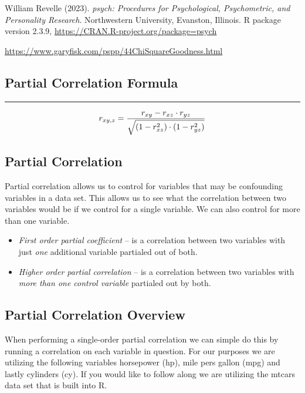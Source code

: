 \documentclass[
]{book}
\providecommand{\tightlist}{%
  \setlength{\itemsep}{0pt}\setlength{\parskip}{0pt}}
\theoremstyle{definition}
\theoremstyle{definition}
\theoremstyle{definition}
\theoremstyle{definition}
\theoremstyle{remark}
\begin{document}
William Revelle (2023). \emph{psych: Procedures for Psychological,
Psychometric, and Personality Research}. Northwestern University,
Evanston, Illinois. R package version 2.3.9,
\url{https://CRAN.R-project.org/package=psych}

\url{https://www.garyfisk.com/pspp/44ChiSquareGoodness.html}

\hypertarget{partial-correlation-formula}{%
\subsection{Partial Correlation Formula}\label{partial-correlation-formula}}

\begin{center}\rule{0.5\linewidth}{0.5pt}\end{center}

\[\Huge
r_{xy,z} = \frac{r_{xy} - r_{xz}  \cdot r_{yz}}{\sqrt{(1-r_{xz}^2) \cdot (1 - r_{yz}^2)}}\]

\hypertarget{partial-correlation}{%
\subsection{Partial Correlation}\label{partial-correlation}}

Partial correlation allows us to control for variables that may be confounding variables in a data set. This allows us to see what the correlation between two variables would be if we control for a single variable. We can also control for more than one variable.

\begin{itemize}
\tightlist
\item
  \emph{First order partial coefficient} -- is a correlation between two variables with just \emph{one} additional variable partialed out of both.
\item
  \emph{Higher order partial correlation} -- is a correlation between two variables with \emph{more than one control variable} partialed out by both.
\end{itemize}

\hypertarget{partial-correlation-overview}{%
\subsection{Partial Correlation Overview}\label{partial-correlation-overview}}

When performing a single-order partial correlation we can simple do this by running a correlation on each variable in question. For our purposes we are utilizing the following variables horsepower (hp), mile pers gallon (mpg) and lastly cylinders (cy). If you would like to follow along we are utilizing the mtcars data set that is built into R.
\end{document}

